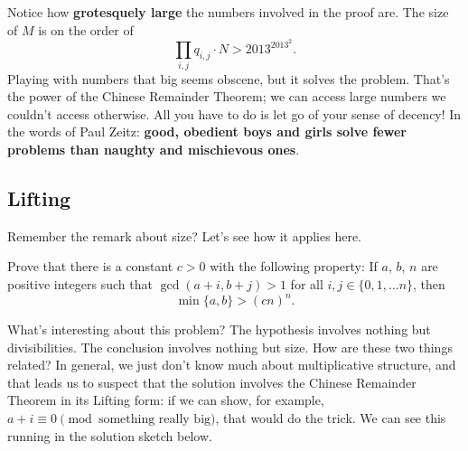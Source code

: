 \documentclass[11pt]{scrartcl}
\begin{document}
Notice how \textbf{grotesquely large} the numbers involved in the proof are.
The size of $M$ is on the order of
\[ \prod_{i,j} q_{i,j} \cdot N > 2013^{2013^2}. \]
Playing with numbers that big seems obscene, but it solves the problem.
That's the power of the Chinese Remainder Theorem;
we can access large numbers we couldn't access otherwise.
All you have to do is let go of your sense of decency!
In the words of Paul Zeitz:
\textbf{good, obedient boys and girls solve fewer problems than naughty and mischievous ones}.

\subsection{Lifting}
Remember the remark about size? Let's see how it applies here.
\begin{example}
  Prove that there is a constant $c>0$ with the following property:
  If $a$, $b$, $n$ are positive integers such that $\gcd(a+i, b+j)>1$
  for all $i, j\in\{0, 1, \ldots n\}$, then \[ \min\{a, b\}> (cn)^n. \]
\end{example}
What's interesting about this problem?
The hypothesis involves nothing but divisibilities.
The conclusion involves nothing but size.
How are these two things related?
In general, we just don't know much about multiplicative structure,
and that leads us to suspect that the solution involves the
Chinese Remainder Theorem in its Lifting form:
if we can show, for example, $a+i \equiv 0 \pmod{\text{something really big}}$, that would do the trick.
We can see this running in the solution sketch below.
\end{document}

